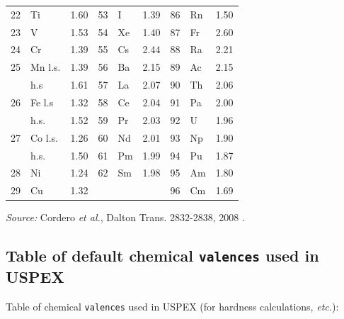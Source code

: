 \documentclass[12pt]{article}
\newcommand{\keyword}[1]{\texttt{#1}}
\begin{document}
\begin{center}
\begin{tabular}{|r|l|l||r|l|l||r|l|l|}
22 & Ti      & 1.60 & 53 & I  & 1.39 & 86 & Rn & 1.50 \\
23 & V       & 1.53 & 54 & Xe & 1.40 & 87 & Fr & 2.60 \\
24 & Cr      & 1.39 & 55 & Cs & 2.44 & 88 & Ra & 2.21 \\
25 & Mn l.s. & 1.39 & 56 & Ba & 2.15 & 89 & Ac & 2.15 \\
   & h.s     & 1.61 & 57 & La & 2.07 & 90 & Th & 2.06 \\
26 & Fe l.s  & 1.32 & 58 & Ce & 2.04 & 91 & Pa & 2.00 \\
   & h.s.    & 1.52 & 59 & Pr & 2.03 & 92 & U  & 1.96 \\
27 & Co l.s. & 1.26 & 60 & Nd & 2.01 & 93 & Np & 1.90 \\
   & h.s.    & 1.50 & 61 & Pm & 1.99 & 94 & Pu & 1.87 \\
28 & Ni      & 1.24 & 62 & Sm & 1.98 & 95 & Am & 1.80 \\
29 & Cu      & 1.32 &    &    &      & 96 & Cm & 1.69 \\
\hline
\end{tabular}

\emph{Source:} Cordero \emph{et al.}, Dalton Trans. 2832-2838, 2008
\cite{Cordero2008}.

\end{center}


\newpage
\subsection{Table of default chemical \keyword{valences} used in USPEX}
\label{appendix_valences}

Table of chemical \keyword{valences} used in USPEX (for hardness calculations,
\emph{etc.}):
\end{document}
